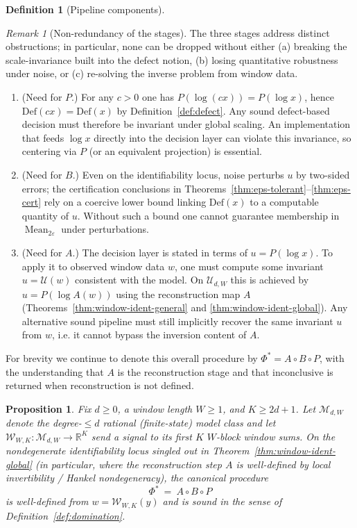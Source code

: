 \documentclass[11pt,reqno]{amsart}
\newtheorem{proposition}[theorem]{Proposition}
\theoremstyle{definition}
\newtheorem{definition}[theorem]{Definition}
\theoremstyle{remark}
\newtheorem{remark}[theorem]{Remark} %
\newcommand{\R}{\mathbb{R}}
\newcommand{\1}{\mathbf{1}}
\newcommand{\inconclusive}{\mathrm{inconclusive}}
\newcommand{\Mean}{\operatorname{Mean}}
\newcommand{\eps}{\varepsilon}
\begin{document}
\begin{definition}[Pipeline components]
\begin{remark}[Non-redundancy of the stages]\label{rem:nonredundancy}
The three stages address distinct obstructions; in particular, none can be dropped without either (a) breaking the scale-invariance built into the defect notion, (b) losing quantitative robustness under noise, or (c) re-solving the inverse problem from window data.
\begin{enumerate}[label=(\alph*)]
\item (Need for $P$.) For any $c>0$ one has $P(\log(cx))=P(\log x)$, hence $\mathrm{Def}(cx)=\mathrm{Def}(x)$ by Definition~\ref{def:defect}. Any sound defect-based decision must therefore be invariant under global scaling. An implementation that feeds $\log x$ directly into the decision layer can violate this invariance, so centering via $P$ (or an equivalent projection) is essential.
\item (Need for $B$.) Even on the identifiability locus, noise perturbs $u$ by two-sided errors; the certification conclusions in Theorems~\ref{thm:eps-tolerant}--\ref{thm:eps-cert} rely on a coercive lower bound linking $\mathrm{Def}(x)$ to a computable quantity of $u$. Without such a bound one cannot guarantee membership in $\Mean_{2\eps}$ under perturbations.
\item (Need for $A$.) The decision layer is stated in terms of $u=P(\log x)$. To apply it to observed window data $w$, one must compute some invariant $u=\mathcal U(w)$ consistent with the model. On $\mathcal U_{d,W}$ this is achieved by $u=P(\log A(w))$ using the reconstruction map $A$ (Theorems~\ref{thm:window-ident-general} and \ref{thm:window-ident-global}). Any alternative sound pipeline must still implicitly recover the same invariant $u$ from $w$, i.e. it cannot bypass the inversion content of $A$.
\end{enumerate}
\end{remark}

For brevity we continue to denote this overall procedure by $\Phi^\ast=A\circ B\circ P$, with the understanding that $A$ is the reconstruction stage and that $\inconclusive$ is returned when reconstruction is not defined.
\end{definition}

\begin{proposition}\label{prop:pipeline-sound}
Fix $d\ge 0$, a window length $W\ge 1$, and $K\ge 2d+1$. Let $\mathcal M_{d,W}$ denote the degree-$\le d$
rational (finite-state) model class and let $\mathcal W_{W,K}:\mathcal M_{d,W}\to\R^K$ send a signal to its
first $K$ $W$-block window sums. On the nondegenerate identifiability locus singled out in
Theorem~\ref{thm:window-ident-global} (in particular, where the reconstruction step $A$ is well-defined by local invertibility / Hankel nondegeneracy), the canonical procedure
\[
\Phi^\ast \:=\ A\circ B\circ P
\]
is well-defined from $w=\mathcal W_{W,K}(y)$ and is sound in the sense of Definition~\ref{def:domination}.
\end{proposition}
\end{document}
